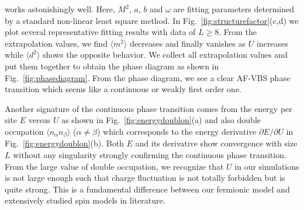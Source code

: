 \documentclass[twocolumn,superscriptaddress]{revtex4-1}
\begin{document}
works astonishingly well. Here, $M^2$, $a$, $b$ and $\omega$ are fitting parameters determined by a standard non-linear least square method. 
In Fig.~\ref{fig:structurefactor}(c,d) we plot several representative fitting results with data of $L\ge8$. From the extrapolation values, we find $\langle m^2 \rangle$ decreases and finally vanishes as $U$ increases while $\langle d^2\rangle$ shows the opposite behavior. We collect all extrapolation values and put them together to obtain the phase diagram as shown in Fig.~\ref{fig:phasediagram}. From the phase diagram, we see a clear AF-VBS phase transition which seems like a continuous or weakly first order one.






Another signature of the continuous phase transition comes from the energy per site $E$ versus $U$ as shown in Fig.~\ref{fig:energydoublon}(a) and also double occupation $\langle n_\alpha n_\beta \rangle$ ($\alpha\ne\beta$) which corresponds to the energy derivative $\partial E/\partial U$ in Fig.~\ref{fig:energydoublon}(b). Both $E$ and its derivative show convergence with size $L$ without any singularity strongly confirming the continuous phase transition. From the large value of double occupation, we recognize that $U$ in our simulations is not large enough such that charge fluctuation is not totally forbidden but is quite strong. This is a fundamental difference between our fermionic model and extensively studied spin models in literature.




\end{document}
